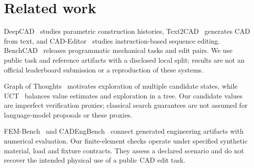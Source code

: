 \section{Related work}
\label{sec:related}
DeepCAD~\cite{wu2021deepcad} studies parametric construction histories, Text2CAD~\cite{khan2024text2cad} generates CAD from text, and CAD-Editor~\cite{cadeditor2025} studies instruction-based sequence editing. BenchCAD~\cite{benchcad2026} releases programmatic mechanical tasks and edit pairs. We use public task and reference artifacts with a disclosed local split; results are not an official leaderboard submission or a reproduction of these systems.

Graph of Thoughts~\cite{besta2023graphthoughts} motivates exploration of multiple candidate states, while UCT~\cite{kocsis2006uct} balances value estimates and exploration in a tree. Our candidate values are imperfect verification proxies; classical search guarantees are not assumed for language-model proposals or these proxies.

FEM-Bench~\cite{fem_bench} and CADEngBench~\cite{cadengbench2026} connect generated engineering artifacts with numerical evaluation. Our finite-element checks operate under specified synthetic material, load and fixture contracts. They assess a declared scenario and do not recover the intended physical use of a public CAD edit task.
